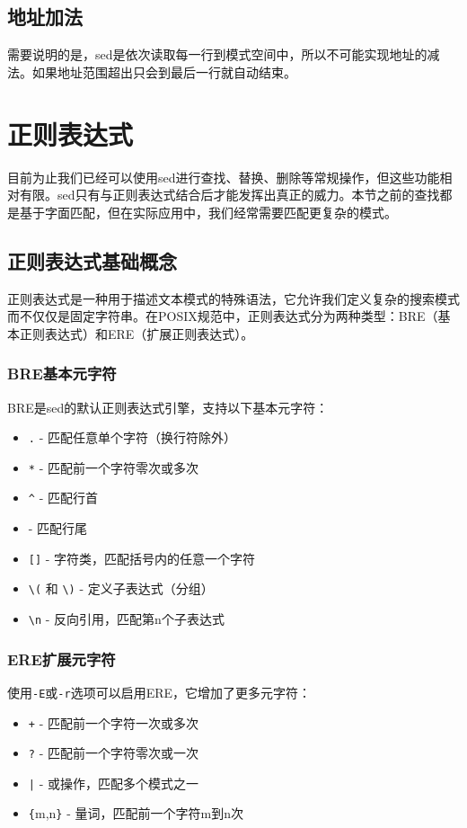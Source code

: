\subsection{地址加法}

需要说明的是，sed是依次读取每一行到模式空间中，所以不可能实现地址的减法。如果地址范围超出只会到最后一行就自动结束。

\section{正则表达式}
目前为止我们已经可以使用sed进行查找、替换、删除等常规操作，但这些功能相对有限。sed只有与正则表达式结合后才能发挥出真正的威力。本节之前的查找都是基于字面匹配，但在实际应用中，我们经常需要匹配更复杂的模式。

\subsection{正则表达式基础概念}
正则表达式是一种用于描述文本模式的特殊语法，它允许我们定义复杂的搜索模式而不仅仅是固定字符串。在POSIX规范中，正则表达式分为两种类型：BRE（基本正则表达式）和ERE（扩展正则表达式）。

\subsubsection{BRE基本元字符}
BRE是sed的默认正则表达式引擎，支持以下基本元字符：
\begin{itemize}
	\item \texttt{.} - 匹配任意单个字符（换行符除外）
	\item \texttt{*} - 匹配前一个字符零次或多次
	\item \texttt{\textasciicircum} - 匹配行首
	\item \texttt{\textdollar} - 匹配行尾
	\item \texttt{[]} - 字符类，匹配括号内的任意一个字符
	\item \texttt{\textbackslash(} 和 \texttt{\textbackslash)} - 定义子表达式（分组）
	\item \texttt{\textbackslash n} - 反向引用，匹配第n个子表达式
\end{itemize}

\subsubsection{ERE扩展元字符}
使用\texttt{-E}或\texttt{-r}选项可以启用ERE，它增加了更多元字符：
\begin{itemize}
	\item \texttt{+} - 匹配前一个字符一次或多次
	\item \texttt{?} - 匹配前一个字符零次或一次
	\item \texttt{|} - 或操作，匹配多个模式之一
	\item \texttt{\{}m,n\texttt{\}} - 量词，匹配前一个字符m到n次
\end{itemize}

